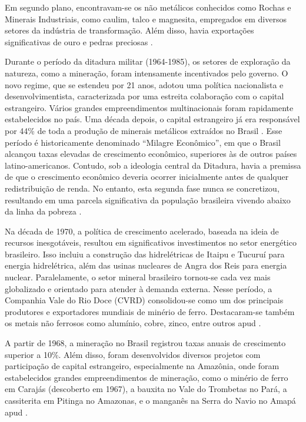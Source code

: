 Em segundo plano, encontravam-se os não metálicos conhecidos como Rochas e Minerais Industriais, como caulim, talco e magnesita, empregados em diversos setores da indústria de transformação. Além disso, havia exportações significativas de ouro e pedras preciosas \cite{villasboas1995mineracao}.

Durante o período da ditadura militar (1964-1985), os setores de exploração da natureza, como a mineração, foram intensamente incentivados pelo governo. O novo regime, que se estendeu por 21 anos, adotou uma política nacionalista e desenvolvimentista, caracterizada por uma estreita colaboração com o capital estrangeiro. Vários grandes empreendimentos multinacionais foram rapidamente estabelecidos no país. Uma década depois, o capital estrangeiro já era responsável por 44\% de toda a produção de minerais metálicos extraídos no Brasil \cite{villasboas1995mineracao}. Esse período é historicamente denominado ``Milagre Econômico'',
em que o Brasil alcançou taxas elevadas de crescimento econômico, superiores às de outros países latino-americanos. Contudo, sob a ideologia central da Ditadura, havia a premissa de que o crescimento econômico deveria ocorrer inicialmente antes de qualquer redistribuição de renda. No entanto, esta segunda fase nunca se concretizou, resultando em uma parcela significativa da população brasileira vivendo abaixo da linha da pobreza \cite{villasboas1995mineracao}.

Na década de 1970, a política de crescimento acelerado, baseada na ideia de recursos inesgotáveis, resultou em significativos investimentos no setor energético brasileiro. Isso incluiu a construção das hidrelétricas de Itaipu e Tucuruí para energia hidrelétrica, além das usinas nucleares de Angra dos Reis para energia nuclear. Paralelamente, o setor mineral brasileiro tornou-se cada vez mais globalizado e orientado para atender à demanda externa. Nesse período, a Companhia Vale do Rio Doce (CVRD) consolidou-se como um dos principais produtores e exportadores mundiais de minério de ferro. Destacaram-se também os metais não ferrosos como alumínio, cobre, zinco, entre outros \cite{villasboas1995mineracao} apud \cite{fernandes2016mineracao}.

A partir de 1968, a mineração no Brasil registrou taxas anuais de crescimento superior a 10\%. Além disso, foram desenvolvidos diversos projetos com participação de capital estrangeiro, especialmente na Amazônia, onde foram estabelecidos grandes empreendimentos de mineração, como o minério de ferro em Carajás (descoberto em 1967), a bauxita no Vale do Trombetas no Pará, a cassiterita em Pitinga no Amazonas, e o manganês na Serra do Navio no Amapá \cite{lins2000brasil} apud \cite{fernandes2016mineracao}.

